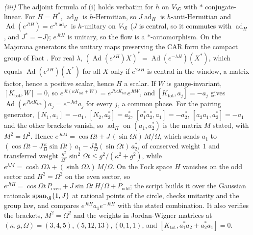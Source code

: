 \emph{(iii)} The adjoint formula of (i) holds verbatim for $h$ on $V_{\C}$ with $*$ conjugate-linear. For $H = H^{*}$, $\operatorname{ad}_{H}$ is $h$-Hermitian, so $J\operatorname{ad}_{H}$ is $h$-anti-Hermitian and $\operatorname{Ad}(e^{JtH}) = e^{Jt\operatorname{ad}_{H}}$ is $h$-unitary on $V_{\C}$ ($J$ is central, so it commutes with $\operatorname{ad}_{H}$, and $J^{*} = -J$); $e^{JtH}$ is unitary, so the flow is a $*$-automorphism. On the Majorana generators the unitary maps preserving the CAR form the compact group of Fact . For real $\lambda$, $(\operatorname{Ad}(e^{\lambda H})X)^{*} = \operatorname{Ad}(e^{-\lambda H})(X^{*})$, which equals $\operatorname{Ad}(e^{\lambda H})(X^{*})$ for all $X$ only if $e^{2\lambda H}$ is central in the window, a matrix factor, hence a positive scalar, hence $H$ a scalar. If $W$ is gauge-invariant, $[K_{\mathrm{tot}}, W] = 0$, so $e^{Jt(\kappa K_{\mathrm{tot}} + W)} = e^{Jt\kappa K_{\mathrm{tot}}}e^{JtW}$, and $[K_{\mathrm{tot}}, a_{j}] = -a_{j}$ gives $\operatorname{Ad}(e^{Jt\kappa K_{\mathrm{tot}}})a_{j} = e^{-J\kappa t}a_{j}$ for every $j$, a common phase. For the pairing generator, $[N_{1}, a_{1}] = -a_{1}$, $[N_{2}, a_{2}^{*}] = a_{2}^{*}$, $[a_{1}^{*}a_{2}^{*}, a_{1}] = -a_{2}^{*}$, $[a_{2}a_{1}, a_{2}^{*}] = -a_{1}$ and the other brackets vanish, so $\operatorname{ad}_{H}$ on $(a_{1}, a_{2}^{*})$ is the matrix $M$ stated, with $M^{2} = \Omega^{2}$. Hence $e^{JtM} = \cos\Omega t + J\,(\sin\Omega t)\,M/\Omega$, which sends $a_{1}$ to $(\cos\Omega t - J\tfrac{\kappa}{\Omega}\sin\Omega t)\,a_{1} - J\tfrac{g}{\Omega}(\sin\Omega t)\,a_{2}^{*}$, of conserved weight $1$ and transferred weight $\tfrac{g^{2}}{\Omega^{2}}\sin^{2}\Omega t \le g^{2}/(\kappa^{2} + g^{2})$, while $e^{\lambda M} = \cosh\Omega\lambda + (\sinh\Omega\lambda)\,M/\Omega$. On the Fock space $H$ vanishes on the odd sector and $H^{2} = \Omega^{2}$ on the even sector, so $e^{JtH} = \cos\Omega t\,P_{\mathrm{even}} + J\sin\Omega t\,H/\Omega + P_{\mathrm{odd}}$; the script builds it over the Gaussian rationals $\mathrm{span}_{\Q}\{1, J\}$ at rational points of the circle, checks unitarity and the group law, and compares $e^{JtH}a_{1}e^{-JtH}$ with the stated combination. It also verifies the brackets, $M^{2} = \Omega^{2}$ and the weights in Jordan-Wigner matrices at $(\kappa, g, \Omega) = (3,4,5), (5,12,13), (0,1,1)$, and $[K_{\mathrm{tot}}, a_{1}^{*}a_{2} + a_{2}^{*}a_{1}] = 0$.

